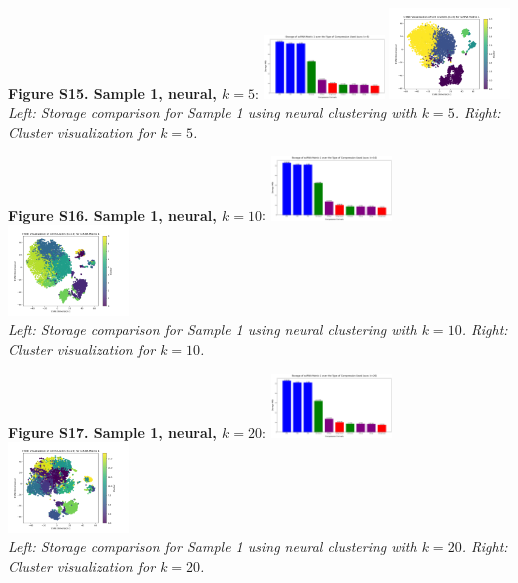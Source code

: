 \documentclass[unnumsec,webpdf,contemporary,large]{oup-authoring-template}
\begin{document}
\textbf{Figure S15. Sample 1, neural, $k=5$}:
\newline
\includegraphics[width=0.24\textwidth]{compressed/neural/sample1/k5/storage_comparisons.png}
\includegraphics[width=0.24\textwidth]{compressed/neural/sample1/k5/clusters.png}\\
\textit{Left: Storage comparison for Sample 1 using neural clustering with $k=5$. Right: Cluster visualization for $k=5$.}

\textbf{Figure S16. Sample 1, neural, $k=10$}:
\newline
\includegraphics[width=0.24\textwidth]{compressed/neural/sample1/k10/storage_comparisons.png}
\includegraphics[width=0.24\textwidth]{compressed/neural/sample1/k10/clusters.png}\\
\textit{Left: Storage comparison for Sample 1 using neural clustering with $k=10$. Right: Cluster visualization for $k=10$.}

\textbf{Figure S17. Sample 1, neural, $k=20$}:
\newline
\includegraphics[width=0.24\textwidth]{compressed/neural/sample1/k20/storage_comparisons.png}
\includegraphics[width=0.24\textwidth]{compressed/neural/sample1/k20/clusters.png}\\
\textit{Left: Storage comparison for Sample 1 using neural clustering with $k=20$. Right: Cluster visualization for $k=20$.}
\end{document}
